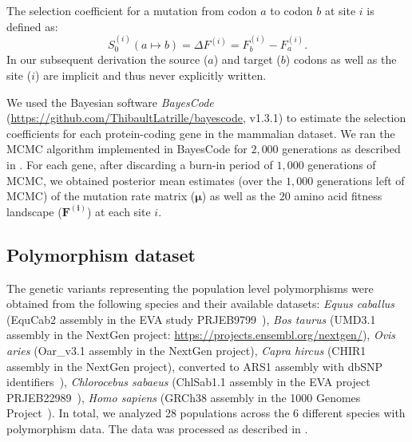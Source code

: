 \documentclass{article}
\newcommand{\UniDimArray}[1]{\bm{#1}}
\newcommand{\Sphy}{S_{0}}
\begin{document}
    The selection coefficient for a mutation from codon $a$ to codon $b$ at site $i$ is defined as:
    \begin{equation}
        \Sphy^{(i)} (a \mapsto b) = \Delta F^{(i)} = F^{(i)}_{b} - F^{(i)}_{a}.
    \end{equation}
    In our subsequent derivation the source ($a$) and target ($b$) codons as well as the site ($i$) are implicit and thus never explicitly written.

    We used the Bayesian software \textit{BayesCode} (\url{https://github.com/ThibaultLatrille/bayescode}, v1.3.1) to estimate the selection coefficients for each protein-coding gene in the mammalian dataset.
    We ran the MCMC algorithm implemented in BayesCode for $2,000$ generations as described in \textcite{latrille_genes_2023}.
    For each gene, after discarding a burn-in period of $1,000$ generations of MCMC, we obtained posterior mean estimates (over the $1,000$ generations left of MCMC) of the mutation rate matrix ($\UniDimArray{\mu}$) as well as the $20$ amino acid fitness landscape ($\UniDimArray{F^{(i)}}$) at each site $i$.

    \subsection{Polymorphism dataset}
    \label{subsec:polymorphism-dataset}

    The genetic variants representing the population level polymorphisms were obtained from the following species and their available datasets: \textit{Equus caballus} (EquCab2 assembly in the EVA study PRJEB9799~\cite{alabri_whole_2020}), \textit{Bos taurus} (UMD3.1 assembly in the NextGen project: \url{https://projects.ensembl.org/nextgen/}), \textit{Ovis aries} (Oar\_v3.1 assembly in the NextGen project), \textit{Capra hircus} (CHIR1 assembly in the NextGen project), converted to ARS1 assembly with dbSNP identifiers~\cite{sherry_dbsnp_2001}), \textit{Chlorocebus sabaeus} (ChlSab1.1 assembly in the EVA project PRJEB22989~\cite{svardal_ancient_2017}), \textit{Homo sapiens} (GRCh38 assembly in the 1000 Genomes Project~\cite{zheng-bradley_alignment_2017}).
    In total, we analyzed 28 populations across the 6 different species with polymorphism data.
    The data was processed as described in \textcite{latrille_genes_2023}.
\end{document}
